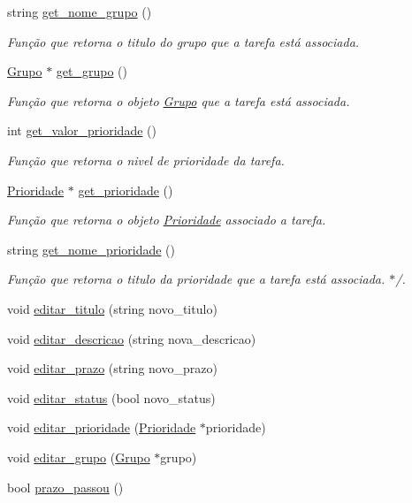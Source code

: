\begin{DoxyCompactItemize}
string \hyperlink{classTarefa_adacf20f53dfea470d6899e7a82d0519c}{get\+\_\+nome\+\_\+grupo} ()
\begin{DoxyCompactList}\small\item\em Função que retorna o titulo do grupo que a tarefa está associada. \end{DoxyCompactList}\item 
\hyperlink{classGrupo}{Grupo} $\ast$ \hyperlink{classTarefa_adf6a36ff108e0c1feecdfbaa38521818}{get\+\_\+grupo} ()
\begin{DoxyCompactList}\small\item\em Função que retorna o objeto \hyperlink{classGrupo}{Grupo} que a tarefa está associada. \end{DoxyCompactList}\item 
int \hyperlink{classTarefa_a5aaca625bccf6f153ec783fe43790cc7}{get\+\_\+valor\+\_\+prioridade} ()
\begin{DoxyCompactList}\small\item\em Função que retorna o nivel de prioridade da tarefa. \end{DoxyCompactList}\item 
\hyperlink{classPrioridade}{Prioridade} $\ast$ \hyperlink{classTarefa_a340f64a1d2344a8088a8e4a85ba03569}{get\+\_\+prioridade} ()
\begin{DoxyCompactList}\small\item\em Função que retorna o objeto \hyperlink{classPrioridade}{Prioridade} associado a tarefa. \end{DoxyCompactList}\item 
string \hyperlink{classTarefa_a9918d709f8b7da0dfe2e60255dd7b167}{get\+\_\+nome\+\_\+prioridade} ()
\begin{DoxyCompactList}\small\item\em Função que retorna o titulo da prioridade que a tarefa está associada. $\ast$/. \end{DoxyCompactList}\item 
void \hyperlink{classTarefa_af4e2d3743837b146e07b97af8027495d}{editar\+\_\+titulo} (string novo\+\_\+titulo)
\item 
void \hyperlink{classTarefa_afb4366be9b8e3e5c16bebc9cb80e5380}{editar\+\_\+descricao} (string nova\+\_\+descricao)
\item 
void \hyperlink{classTarefa_abe764b58fe48c8d191a7fc3cea2e9b72}{editar\+\_\+prazo} (string novo\+\_\+prazo)
\item 
void \hyperlink{classTarefa_a23d6b6e297a821fbb6f2aa91ac43fa11}{editar\+\_\+status} (bool novo\+\_\+status)
\item 
void \hyperlink{classTarefa_a5abdc3ba5dc800ade79d36b9aafd0e7f}{editar\+\_\+prioridade} (\hyperlink{classPrioridade}{Prioridade} $\ast$prioridade)
\item 
void \hyperlink{classTarefa_abfe620f867e896cb77d016b229e92f6e}{editar\+\_\+grupo} (\hyperlink{classGrupo}{Grupo} $\ast$grupo)
\item 
bool \hyperlink{classTarefa_a604bd50ddc5ad8c919b432282d141ee0}{prazo\+\_\+passou} ()
\end{DoxyCompactItemize}
